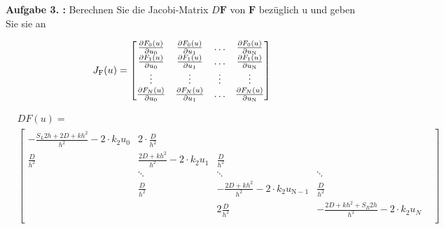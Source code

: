 \begin{mybox}
	\textbf{Aufgabe 3. :} Berechnen Sie die Jacobi-Matrix $D\mathbf{F}$ von
	$\mathbf{F}$ bezüglich u und geben Sie sie an
\end{mybox}
\begin{equation}
	J_\mathrm{F}(u)=
	\begin{bmatrix}
		\pdv{F_0(u)}{u_0} & \pdv{F_0(u)}{u_1} & \dots  &
		\pdv{F_0(u)}{u_\mathrm{N}}                              \\
		\pdv{F_1(u)}{u_0} & \pdv{F_1(u)}{u_1} & \dots  &
		\pdv{F_1(u)}{u_\mathrm{N}}                              \\
		\vdots            & \vdots            & \vdots & \vdots \\
		\pdv{F_N(u)}{u_0} & \pdv{F_N(u)}{u_1} & \dots  &
		\pdv{F_N(u)}{u_\mathrm{N}}

	\end{bmatrix}
\end{equation}

\begin{align}
	 & DF(u)\mathrm=                                                  \\
	 & \begin{bmatrix}
		   -	\frac{S_L2h+2D+kh^2}{h^2}-2\cdot k_2u_0 &
		   2\cdot \frac{D}{h^2}                     &                                                                              \\
		   \frac{D}{h^2}                            & \frac{2D+kh^2}{h^2}-2\cdot k_2
		   u_\mathrm{1}                             & \frac{D}{h^2}                                                                \\
		                                            & \ddots                         & \ddots                           & \ddots & \\
		                                            & \frac{D}{h^2}                  & - \frac{2D+kh^2}{h^2}-2\cdot k_2
		   u_\mathrm{N-1}                           & \frac{D}{h^2}                                                                \\
		                                            &                                & 2\frac{D}{h^2}                   &
		   -\frac{2D+kh^2+S_R2h}{h^2}-2\cdot k_2u_N                                                                                \\
	   \end{bmatrix}
\end{align}

